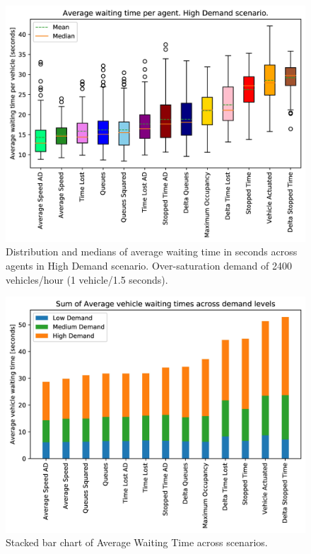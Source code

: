 \documentclass[conference]{IEEEtran}
\begin{document}
\begin{figure}[thpb]
    \centering
    \includegraphics[width=\linewidth]{figures/rand_1_5_ordered_color_DS.jpg}
    \caption{Distribution and medians of average waiting time in seconds across agents in High Demand scenario. Over-saturation demand of 2400 vehicles/hour (1 vehicle/1.5 seconds).}
    \label{fig:high}
\end{figure}

\begin{figure}[thpb]
    \centering
    \includegraphics[width=\linewidth]{figures/stacked_average_delay_ordered_by_sum_DS.jpg}
    \caption{Stacked bar chart of Average Waiting Time across scenarios.}
    \label{fig:stack}
\end{figure}
\end{document}
